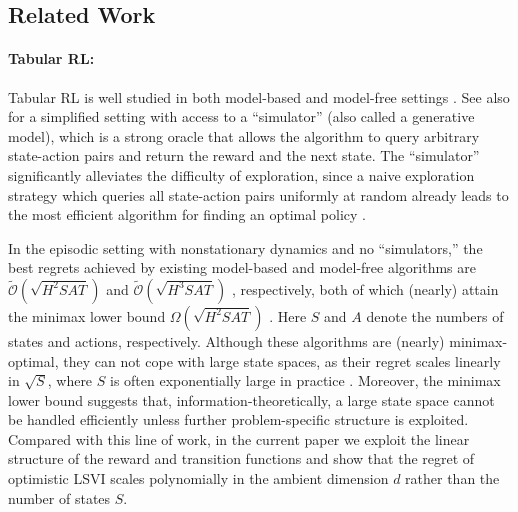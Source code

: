 


\subsection{Related Work}\label{sec:related}

\paragraph{Tabular RL:}
Tabular RL is well studied in both model-based \cite{jaksch2010near, osband2014generalization, azar2017minimax, dann2017unifying} and model-free settings \cite{strehl2006pac, jin2018q}. See also \cite{koenig1993complexity, azar2011speedy, azar2012sample, lattimore2012pac, sidford2018variance, wainwright2019variance} for a simplified setting with access to a ``simulator'' (also called a generative model), which is a strong oracle that allows the algorithm to query arbitrary state-action pairs and return the reward and the next state. The ``simulator'' significantly alleviates the difficulty of exploration, since a naive exploration strategy which queries all state-action pairs uniformly at random already leads to the most efficient algorithm for finding an optimal policy \cite{azar2012sample}.

In the episodic setting with nonstationary dynamics and no ``simulators,'' the best regrets achieved by existing model-based and model-free algorithms are $\tilde{\mathcal{O}}(\sqrt{H^2 S A T})$ \cite{azar2017minimax} and $\tilde{\mathcal{O}}(\sqrt{H^3 S A T})$ \cite{jin2018q}, respectively, both of which (nearly) attain the minimax lower bound $\Omega(\sqrt{H^2 S A T})$ \cite{jaksch2010near, osband2016lower, jin2018q}.
Here $S$ and $A$ denote the numbers of states and actions, respectively. Although these algorithms are (nearly) minimax-optimal, they can not cope with large state spaces, as their regret scales linearly in $\sqrt{S}$, where $S$ is often exponentially large in practice \cite[see, e.g.,][]{mnih2013playing, silver2016mastering, kober2012reinforcement, li2016deep}. Moreover, the minimax lower bound suggests that, information-theoretically, a large state space cannot be handled efficiently unless further problem-specific structure is exploited. Compared with this line of work, in the current paper we exploit the linear structure of the reward and transition functions and show that the regret of optimistic LSVI scales polynomially in the ambient dimension $d$ rather than the number of states $S$. 


